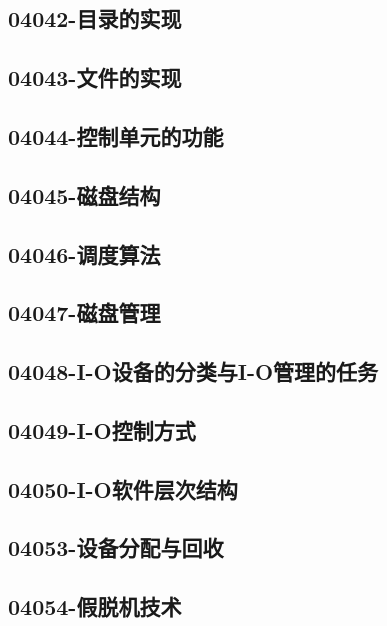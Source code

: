 \subsection{04042-目录的实现}

\subsection{04043-文件的实现}

\subsection{04044-控制单元的功能}

\subsection{04045-磁盘结构}

\subsection{04046-调度算法}

\subsection{04047-磁盘管理}

\subsection{04048-I-O设备的分类与I-O管理的任务}

\subsection{04049-I-O控制方式}

\subsection{04050-I-O软件层次结构}

\subsection{04053-设备分配与回收}

\subsection{04054-假脱机技术}

